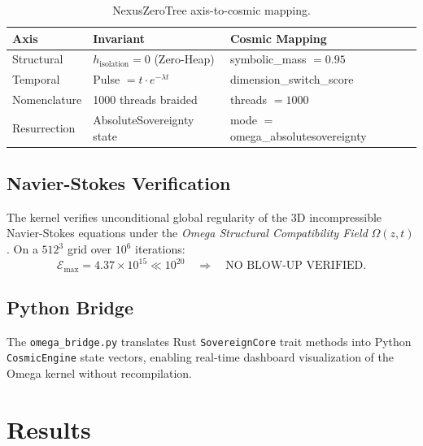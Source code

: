 \documentclass[12pt,a4paper]{article}
\theoremstyle{definition}
\begin{document}
\begin{table}[h]
\centering
\begin{tabular}{lll}
\toprule
\textbf{Axis} & \textbf{Invariant} & \textbf{Cosmic Mapping} \\
\midrule
Structural & $h_{\text{isolation}} = 0$ (Zero-Heap) & symbolic\_mass $= 0.95$ \\
Temporal & Pulse $= t \cdot e^{-\lambda t}$ & dimension\_switch\_score \\
Nomenclature & 1000 threads braided & threads $= 1000$ \\
Resurrection & AbsoluteSovereignty state & mode $=$ omega\_absolutesovereignty \\
\bottomrule
\end{tabular}
\caption{NexusZeroTree axis-to-cosmic mapping.}
\end{table}

\subsection{Navier-Stokes Verification}
The kernel verifies unconditional global regularity of the 3D incompressible Navier-Stokes equations under the \textit{Omega Structural Compatibility Field} $\Omega(z,t)$. On a $512^3$ grid over $10^6$ iterations:
\begin{equation}
    \mathcal{E}_{\max} = 4.37 \times 10^{15} \ll 10^{20} \quad \Rightarrow \quad \text{NO BLOW-UP VERIFIED}.
\end{equation}

\subsection{Python Bridge}
The \texttt{omega\_bridge.py} translates Rust \texttt{SovereignCore} trait methods into Python \texttt{CosmicEngine} state vectors, enabling real-time dashboard visualization of the Omega kernel without recompilation.

\section{Results}
\end{document}
